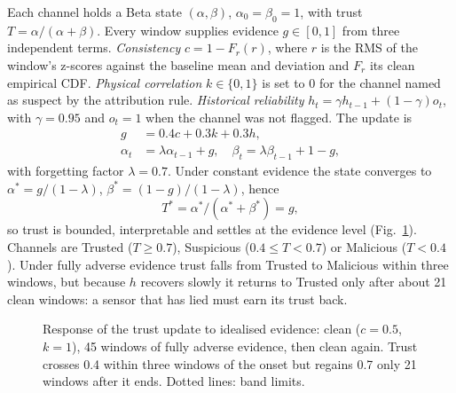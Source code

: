 \documentclass[conference]{IEEEtran}
\begin{document}
Each channel holds a Beta state $(\alpha, \beta)$, $\alpha_0 = \beta_0 = 1$, with trust $T = \alpha / (\alpha + \beta)$. Every window supplies evidence $g \in [0, 1]$ from three independent terms. \emph{Consistency} $c = 1 - F_r(r)$, where $r$ is the RMS of the window's z-scores against the baseline mean and deviation and $F_r$ its clean empirical CDF. \emph{Physical correlation} $k \in \{0, 1\}$ is set to $0$ for the channel named as suspect by the attribution rule. \emph{Historical reliability} $h_t = \gamma h_{t-1} + (1 - \gamma) o_t$, with $\gamma = 0.95$ and $o_t = 1$ when the channel was not flagged. The update is
\begin{align}
g &= 0.4c + 0.3k + 0.3h, \\
\alpha_t &= \lambda \alpha_{t-1} + g, \quad
\beta_t = \lambda \beta_{t-1} + 1 - g,
\end{align}
with forgetting factor $\lambda = 0.7$. Under constant evidence the state converges to $\alpha^{*} = g/(1-\lambda)$, $\beta^{*} = (1-g)/(1-\lambda)$, hence
\begin{equation}
T^{*} = \alpha^{*} / (\alpha^{*} + \beta^{*}) = g,
\end{equation}
so trust is bounded, interpretable and settles at the evidence level (Fig.~\ref{fig:trust}). Channels are Trusted ($T \geq 0.7$), Suspicious ($0.4 \leq T < 0.7$) or Malicious ($T < 0.4$). Under fully adverse evidence trust falls from Trusted to Malicious within three windows, but because $h$ recovers slowly it returns to Trusted only after about 21 clean windows: a sensor that has lied must earn its trust back.

\begin{figure}[t]
\centering
{}
\caption{Response of the trust update to idealised evidence: clean ($c{=}0.5$, $k{=}1$), 45 windows of fully adverse evidence, then clean again. Trust crosses 0.4 within three windows of the onset but regains 0.7 only 21 windows after it ends. Dotted lines: band limits.}
\label{fig:trust}
\end{figure}
\end{document}
